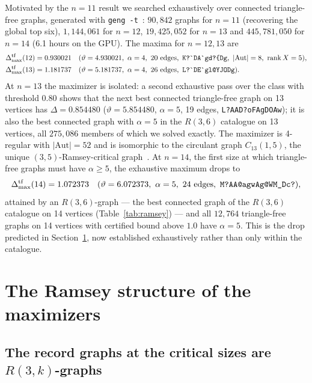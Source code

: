 \documentclass[11pt]{article}
\renewcommand{\theta}{\vartheta}
\newcommand{\gap}{\Delta}
\newcommand{\g}[1]{\texttt{#1}}
\begin{document}
Motivated by the $n=11$ result we searched exhaustively over connected triangle-free graphs, generated with \texttt{geng -t}~\cite{nauty}: $90{,}842$ graphs for $n=11$ (recovering the global top six), $1{,}144{,}061$ for $n=12$, $19{,}425{,}052$ for $n=13$ and $445{,}781{,}050$ for $n=14$ (6.1 hours on the GPU). The maxima for $n=12,13$ are
\begin{align*}
\gap_{\max}^{\rm tf}(12)&=0.930021\quad(\theta=4.930021,\ \alpha=4,\ 20\text{ edges},\ \g{K?\textasciigrave{}DA\textasciigrave{}gd?\{Dg},\ |\mathrm{Aut}|=8,\ \operatorname{rank}X=5),\\
\gap_{\max}^{\rm tf}(13)&=1.181737\quad(\theta=5.181737,\ \alpha=4,\ 26\text{ edges},\ \g{L?\textasciigrave{}DE\textasciigrave{}gl@YJODg}).
\end{align*}
At $n=13$ the maximizer is isolated: a second exhaustive pass over the class with threshold $0.80$ shows that the next best connected triangle-free graph on 13 vertices has $\gap=0.854480$ ($\theta=5.854480$, $\alpha=5$, 19 edges, \g{L?AAD?oFAgDOAw}); it is also the best connected graph with $\alpha=5$ in the $R(3,6)$ catalogue on 13 vertices, all $275{,}086$ members of which we solved exactly.
The maximizer is 4-regular with $|\mathrm{Aut}|=52$ and is isomorphic to the circulant graph $C_{13}(1,5)$, the unique $(3,5)$-Ramsey-critical graph~\cite{radziszowski}. At $n=14$, the first size at which triangle-free graphs must have $\alpha\ge5$, the exhaustive maximum drops to
\[
\gap_{\max}^{\rm tf}(14)=1.072373\quad(\theta=6.072373,\ \alpha=5,\ 24\text{ edges},\ \g{M?AA@agwAg@WM\_Dc?}),
\]
attained by an $R(3,6)$-graph --- the best connected graph of the $R(3,6)$ catalogue on 14 vertices (Table~\ref{tab:ramsey}) --- and all $12{,}764$ triangle-free graphs on 14 vertices with certified bound above $1.0$ have $\alpha=5$. This is the drop predicted in Section~\ref{sec:ramsey}, now established exhaustively rather than only within the catalogue.

\section{The Ramsey structure of the maximizers}\label{sec:ramsey}

\subsection{The record graphs at the critical sizes are $R(3,k)$-graphs}
\end{document}
